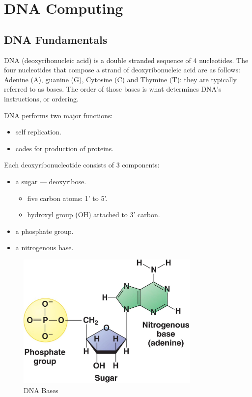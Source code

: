 \section{DNA Computing}
\label{sec:theory}

\subsection{DNA Fundamentals}
DNA (deoxyribonucleic acid) is a double stranded sequence of 4 nucleotides. The four nucleotides that compose a strand of deoxyribonucleic acid are as
follows: Adenine (A), guanine (G), Cytosine (C) and Thymine (T): they are typically referred to as bases. The order of those bases is what determines DNA’s instructions, or ordering.

DNA performs two major functions:
  \begin{itemize}
    \item self replication.
        \item codes for production of proteins.
  \end{itemize}
Each deoxyribonucleotide consists of 3 components:
  \begin{itemize}

  \item {a sugar — deoxyribose.
      \begin{itemize}
      \item five carbon atoms: 1' to 5'.
      \item hydroxyl group (OH) attached to 3' carbon.
    \end{itemize}}
  \item a phosphate group.
  \item a nitrogenous base.
\end{itemize}


\begin{figure}[h!]
  \centering
  \includegraphics[width=0.8\textwidth]{images/dnaBases}
  \caption{DNA Bases}
\end{figure}

